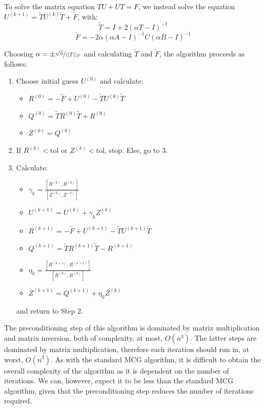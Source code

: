 \documentclass[11pt]{article}
\numberwithin{equation}{section}
\begin{document}
To solve the matrix equation $TU + UT = F$, we instead solve the equation $U^{(k+1)} = \widetilde{T}U^{(k)} \widetilde{T} + \widetilde{F}$, with:
\[ \widetilde{T} = I + 2(\alpha T - I)^{-1} \]
\[ \widetilde{F} = -2\alpha(\alpha A - I)^{-1} C (\alpha B - I)^{-1} \]

Choosing $\alpha = \pm \nicefrac{\sqrt{n}}{||T||_F}$ and calculating $\widetilde{T}$ and $\widetilde{F}$, the algorithm proceeds as follows:
\begin{enumerate}
\item Choose initial guess $U^{(0)}$ and calculate:
	\begin{itemize}
	\item $R^{(0)} = -\widetilde{F} + U^{(0)} - \widetilde{T}U^{(0)} \widetilde{T}$
	\item $Q^{(0)} = \widetilde{T} R^{(0)}\widetilde{T} + R^{(0)}$
	\item $Z^{(0)} = Q^{(0)}$
	\end{itemize}
\item If $R^{(k)} < \text{tol}$ or $Z^{(k)} < \text{tol}$, stop. Else, go to 3.
\item Calculate:
	\begin{itemize}
	\item $ \gamma_k = \frac{[R^{(k)}, R^{(k)}]}{[Z^{(k)}, Z^{(k)}]}$
	\item $U^{(k+1)} = U^{(k)} + \gamma_k Z^{(k)} $
	\item $R^{(k+1)} = -\widetilde{F} + U^{(k+1)} - \widetilde{T}U^{(k+1)} \widetilde{T}$
	\item $Q^{(k+1)} = \widetilde{T} R^{(k+1)}\widetilde{T} - R^{(k+1)}$
	\item $\eta_k = \frac{[R^{(k+1)}, R^{(k+1)}]}{[R^{(k)}, R^{(k)}]}$ 
	\item $Z^{(k+1)} = Q^{(k+1)} + \eta_k Z^{(k)}$
	\end{itemize}
	and return to Step 2.
\end{enumerate}

The preconditioning step of this algorithm is dominated by matrix multiplication and matrix inversion, both of complexity, at most, $O(n^3)$. The latter steps are dominated by matrix multiplication, therefore each iteration should run in, at worst, $O(n^3)$. As with the standard MCG algorithm, it is difficult to obtain the overall complexity of the algorithm as it is dependent on the number of iterations. We can, however, expect it to be less than the standard MCG algorithm, given that the preconditioning step reduces the number of iterations required.
\end{document}
